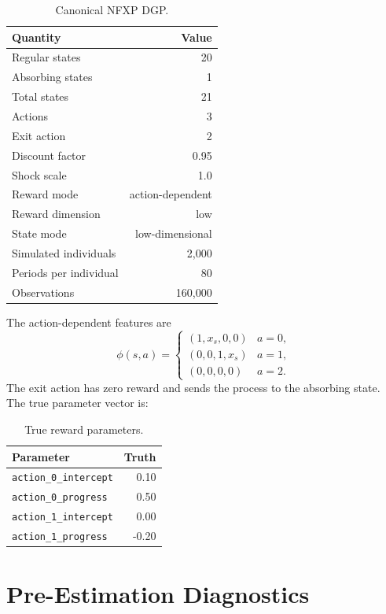 \documentclass[10pt]{article}
\begin{document}
\begin{table}[H]
\centering\small
\caption{Canonical NFXP DGP.}
\begin{tabular}{lr}
\toprule
Quantity & Value \\
\midrule
Regular states & 20 \\
Absorbing states & 1 \\
Total states & 21 \\
Actions & 3 \\
Exit action & 2 \\
Discount factor & 0.95 \\
Shock scale & 1.0 \\
Reward mode & action-dependent \\
Reward dimension & low \\
State mode & low-dimensional \\
Simulated individuals & 2,000 \\
Periods per individual & 80 \\
Observations & 160,000 \\
\bottomrule
\end{tabular}
\end{table}

The action-dependent features are
\[
\phi(s,a)
=
\begin{cases}
(1, x_s, 0, 0) & a = 0,\\
(0, 0, 1, x_s) & a = 1,\\
(0, 0, 0, 0) & a = 2.
\end{cases}
\]
The exit action has zero reward and sends the process to the absorbing state.
The true parameter vector is:

\begin{table}[H]
\centering\small
\caption{True reward parameters.}
\begin{tabular}{lr}
\toprule
Parameter & Truth \\
\midrule
\texttt{action\_0\_intercept} & 0.10 \\
\texttt{action\_0\_progress} & 0.50 \\
\texttt{action\_1\_intercept} & 0.00 \\
\texttt{action\_1\_progress} & -0.20 \\
\bottomrule
\end{tabular}
\end{table}

\section{Pre-Estimation Diagnostics}
\end{document}
